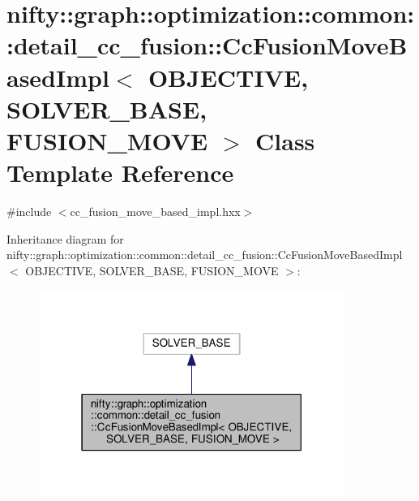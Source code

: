 \hypertarget{classnifty_1_1graph_1_1optimization_1_1common_1_1detail__cc__fusion_1_1CcFusionMoveBasedImpl}{}\section{nifty\+:\+:graph\+:\+:optimization\+:\+:common\+:\+:detail\+\_\+cc\+\_\+fusion\+:\+:Cc\+Fusion\+Move\+Based\+Impl$<$ O\+B\+J\+E\+C\+T\+I\+V\+E, S\+O\+L\+V\+E\+R\+\_\+\+B\+A\+S\+E, F\+U\+S\+I\+O\+N\+\_\+\+M\+O\+V\+E $>$ Class Template Reference}
\label{classnifty_1_1graph_1_1optimization_1_1common_1_1detail__cc__fusion_1_1CcFusionMoveBasedImpl}


{\ttfamily \#include $<$cc\+\_\+fusion\+\_\+move\+\_\+based\+\_\+impl.\+hxx$>$}



Inheritance diagram for nifty\+:\+:graph\+:\+:optimization\+:\+:common\+:\+:detail\+\_\+cc\+\_\+fusion\+:\+:Cc\+Fusion\+Move\+Based\+Impl$<$ O\+B\+J\+E\+C\+T\+I\+V\+E, S\+O\+L\+V\+E\+R\+\_\+\+B\+A\+S\+E, F\+U\+S\+I\+O\+N\+\_\+\+M\+O\+V\+E $>$\+:\nopagebreak
\begin{figure}[H]
\begin{center}
\leavevmode
\includegraphics[width=283pt]{classnifty_1_1graph_1_1optimization_1_1common_1_1detail__cc__fusion_1_1CcFusionMoveBasedImpl__inherit__graph}
\end{center}
\end{figure}


